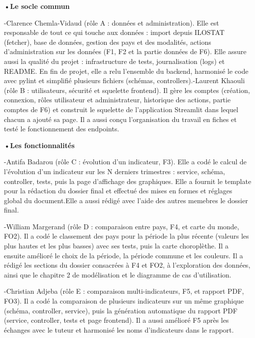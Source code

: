 \documentclass[
  french,
  12pt,
  letterpaper,
  DIV=11,
  numbers=noendperiod]{scrartcl}
\begin{document}
\textbf{•Le socle commun}

-Clarence Chemla-Vidaud (rôle A : données et administration). Elle est
responsable de tout ce qui touche aux données : import depuis ILOSTAT
(fetcher), base de données, gestion des pays et des modalités, actions
d'administration sur les données (F1, F2 et la partie données de F6).
Elle assure aussi la qualité du projet : infrastructure de tests,
journalisation (logs) et README. En fin de projet, elle a relu
l'ensemble du backend, harmonisé le code avec pylint et simplifié
plusieurs fichiers (schémas, controllers).\newline -Laurent Khaouli
(rôle B : utilisateurs, sécurité et squelette frontend). Il gère les
comptes (création, connexion, rôles utilisateur et administrateur,
historique des actions, partie comptes de F6) et construit le squelette
de l'application Streamlit dans lequel chacun a ajouté sa page. Il a
aussi conçu l'organisation du travail en fiches et testé le
fonctionnement des endpoints.

\textbf{•Les fonctionnalités}

-Antifa Badarou (rôle C : évolution d'un indicateur, F3). Elle a codé le
calcul de l'évolution d'un indicateur sur les N derniers trimestres :
service, schéma, controller, tests, puis la page d'affichage des
graphiques. Elle a fournit le template pour la rédaction du dossier
final et effectué des mises en formes et réglages global du
document.Elle a aussi rédigé avec l'aide des autres memebres le dossier
final.\newline

-William Margerand (rôle D : comparaison entre pays, F4, et carte du
monde, FO2). Il a codé le classement des pays pour la période la plus
récente (valeurs les plus hautes et les plus basses) avec ses tests,
puis la carte choroplèthe. Il a ensuite amélioré le choix de la période,
la période commune et les couleurs. Il a rédigé les sections du dossier
consacrées à F4 et FO2, à l'exploration des données, ainsi que le
chapitre 2 de modélisation et le diagramme de cas d'utilisation.\newline

-Christian Adjeba (rôle E : comparaison multi-indicateurs, F5, et
rapport PDF, FO3). Il a codé la comparaison de plusieurs indicateurs sur
un même graphique (schéma, controller, service), puis la génération
automatique du rapport PDF (service, controller, tests et page
frontend). Il a aussi amélioré F5 après les échanges avec le tuteur et
harmonisé les noms d'indicateurs dans le rapport.\newline
\end{document}
